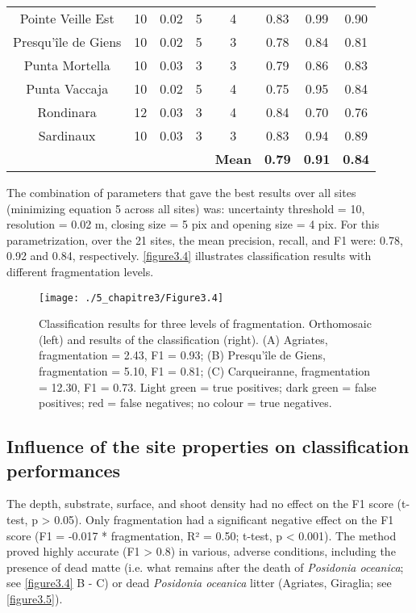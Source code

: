 \begin{table}[H]
\begin{tabular}{*{1}{c}|*{4}{c}|*{3}{c}}
        Pointe Veille Est & 10 & 0.02 & 5 & 4 & 0.83 & 0.99 & 0.90 \\
        Presqu’île de Giens & 10 & 0.02 & 5 & 3 & 0.78 & 0.84 & 0.81 \\
        Punta Mortella & 10 & 0.03 & 3 & 3 & 0.79 & 0.86 & 0.83 \\
        Punta Vaccaja & 10 & 0.02 & 5 & 4 & 0.75 & 0.95 & 0.84 \\
        Rondinara & 12 & 0.03 & 3 & 4 & 0.84 & 0.70 & 0.76 \\
        Sardinaux & 10 & 0.03 & 3 & 3 & 0.83 & 0.94 & 0.89 \\
        \midrule
         &  &  &  & \textbf{Mean} & \textbf{0.79} & \textbf{0.91} & \textbf{0.84} \\ \bottomrule
    \end{tabular}
\end{table}

The combination of parameters that gave the best results over all sites (minimizing equation 5 across all sites) was: uncertainty threshold = 10, resolution = 0.02 m, closing size = 5 pix and opening size = 4 pix. For this parametrization, over the 21 sites, the mean precision, recall, and F1 were: 0.78, 0.92 and 0.84, respectively. \autoref{figure3.4} illustrates classification results with different fragmentation levels.

\begin{figure}[htbp]
	\begin{center}
	\texttt{[image: ./5\_chapitre3/Figure3.4]}
		\caption[Classification results for three levels of fragmentation.]{Classification results for three levels of fragmentation. Orthomosaic (left) and results of the classification (right). (A) Agriates, fragmentation = 2.43, F1 = 0.93; (B) Presqu’île de Giens, fragmentation = 5.10, F1 = 0.81; (C) Carqueiranne, fragmentation = 12.30, F1 = 0.73. Light green = true positives; dark green = false positives; red = false negatives; no colour = true negatives.}
	\label{figure3.4}
\end{center}
\end{figure}

\subsection{Influence of the site properties on classification performances}
The depth, substrate, surface, and shoot density had no effect on the F1 score (t-test, p > 0.05). Only fragmentation had a significant negative effect on the F1 score (F1 = -0.017 * fragmentation, R² = 0.50; t-test, p < 0.001). The method proved highly accurate (F1 > 0.8) in various, adverse conditions, including the presence of dead matte (i.e. what remains after the death of \textit{Posidonia oceanica}; see \autoref{figure3.4} B - C) or dead \textit{Posidonia oceanica} litter (Agriates, Giraglia; see \autoref{figure3.5}). 

